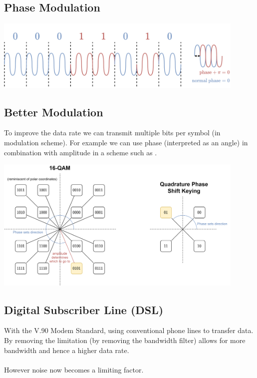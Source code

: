 \subsection{Phase Modulation}
\begin{center}\includegraphics[width=0.9\textwidth]{physical_layer/images/phase modulation}\end{center}

\subsection{Better Modulation}
To improve the data rate we can transmit multiple bits per symbol (in modulation scheme).
For example we can use phase (interpreted as an angle) in combination with amplitude in a scheme such as .
\begin{center}\includegraphics[width=0.9\textwidth]{physical_layer/images/quadrature phase shift keying}\end{center}

\subsection{Digital Subscriber Line (DSL)}
With the V.90 Modem Standard, using conventional phone lines to transfer data.
By removing the limitation (by removing the bandwidth filter)  allows for more bandwidth and hence a higher data rate.
\\
\\ However noise now becomes a limiting factor.

